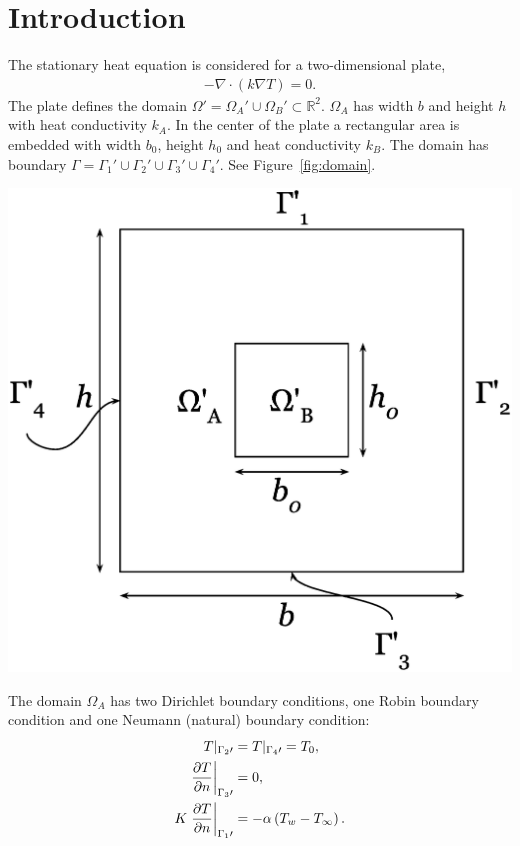 \section{Introduction}
The stationary heat equation is considered for a two-dimensional plate,
\begin{gather}
    -\nabla\cdot\left(k\nabla T\right)=0.
\end{gather}\label{eq:heat}The plate defines the domain $\Omega\prime= \Omega_A\prime\cup\Omega_B\prime \subset \mathbb{R}^2$. $\Omega_A$ has width $b$ and height $h$ with heat conductivity $k_A$. In the center of the plate a rectangular area is embedded with width $b_0$, height $h_0$ and heat conductivity $k_B$. The domain has boundary $\Gamma=\Gamma_1\prime\cup\Gamma_2\prime\cup\Gamma_3\prime\cup\Gamma_4\prime$. See Figure~\ref{fig:domain}. 
\begin{Figure}
 \centerfloat
 \includegraphics[width=0.7\linewidth]{domain.eps}
 \label{fig:domain}
\end{Figure}The domain $\Omega_A$ has two Dirichlet boundary conditions, one Robin boundary condition and one Neumann (natural) boundary condition: 
\begin{gather*}
\begin{align*}
    T|_{\Gamma_2\prime} &= T\arrowvert_{\Gamma_4\prime} = T_0,\\
    \left.\frac{\partial T}{\partial n}\right|_{\Gamma_3\prime} &= 0,\\
    K\left.\frac{\partial T}{\partial n}\right|_{\Gamma_1\prime} &= -\alpha \left(T_w - T_{\infty}\right).
\end{align*}
\end{gather*}